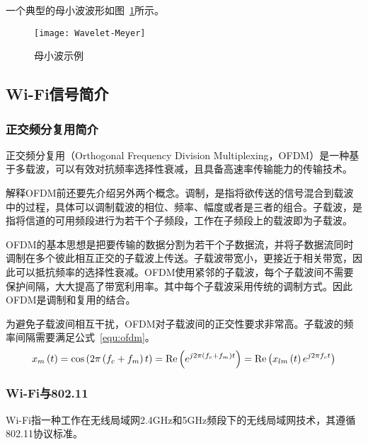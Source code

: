 一个典型的母小波波形如图~\ref{fig:Wavelet-Meyer}所示。
\begin{figure}[htbp] %
  \centering
  \texttt{[image: Wavelet-Meyer]}
  \caption{母小波示例}
  \label{fig:Wavelet-Meyer}
\end{figure}

\subsection{Wi-Fi信号简介}
\subsubsection{正交频分复用简介}
正交频分复用（Orthogonal Frequency Division Multiplexing，OFDM）是一种基于多载波，可以有效对抗频率选择性衰减，且具备高速率传输能力的传输技术。

解释OFDM前还要先介绍另外两个概念。调制，是指将欲传送的信号混合到载波中的过程，具体可以调制载波的相位、频率、幅度或者是三者的组合。子载波，是指将信道的可用频段进行为若干个子频段，工作在子频段上的载波即为子载波。

OFDM的基本思想是把要传输的数据分割为若干个子数据流，并将子数据流同时调制在多个彼此相互正交的子载波上传送。子载波带宽小，更接近于相关带宽，因此可以抵抗频率的选择性衰减。OFDM使用紧邻的子载波，每个子载波间不需要保护间隔，大大提高了带宽利用率。其中每个子载波采用传统的调制方式。因此OFDM是调制和复用的结合。

为避免子载波间相互干扰，OFDM对子载波间的正交性要求非常高。子载波的频率间隔需要满足公式~\ref{equ:ofdm}。
\begin{equation}
\label{equ:ofdm}
{x_m}\left( t \right) = \cos \left( {2\pi \left( {{f_c} + {f_m}} \right)t} \right) = {\mathop{\rm Re}\nolimits} \left( {{e^{j2\pi \left( {{f_c} + {f_m}} \right)t}}} \right) = {\mathop{\rm Re}\nolimits} \left( {{x_{lm}}\left( t \right){e^{j2\pi {f_c}t}}} \right)
\end{equation}

\subsubsection{Wi-Fi与802.11}

Wi-Fi指一种工作在无线局域网2.4GHz和5GHz频段下的无线局域网技术，其遵循802.11协议标准。

